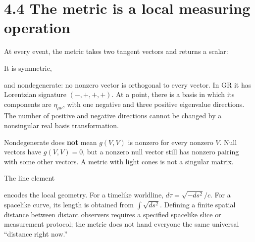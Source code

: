 \documentclass[
  11pt,
  letterpaper,
  oneside,
  openany]{scrbook}
\begin{document}
\hypertarget{the-metric-is-a-local-measuring-operation}{%
\section{4.4 The metric is a local measuring
operation}\label{the-metric-is-a-local-measuring-operation}}

At every event, the metric takes two tangent vectors and returns a
scalar:

\begin{center}
\begingroup
{}
\ifdim\wd\grmathbox>\linewidth
\resizebox{\linewidth}{!}{\usebox{\grmathbox}}
\else\usebox{\grmathbox}\fi
\endgroup
\end{center}

It is symmetric,

\begin{center}
\begingroup
{}
\ifdim\wd\grmathbox>\linewidth
\resizebox{\linewidth}{!}{\usebox{\grmathbox}}
\else\usebox{\grmathbox}\fi
\endgroup
\end{center}

and nondegenerate: no nonzero vector is orthogonal to every vector. In
GR it has Lorentzian signature \((-,+,+,+)\). At a point, there is a
basis in which its components are \(\eta_{\mu\nu}\), with one negative
and three positive eigenvalue directions. The number of positive and
negative directions cannot be changed by a nonsingular real basis
transformation.

Nondegenerate does \textbf{not} mean \(g(V,V)\) is nonzero for every
nonzero \(V\). Null vectors have \(g(V,V)=0\), but a nonzero null vector
still has nonzero pairing with some other vectors. A metric with light
cones is not a singular matrix.

The line element

\begin{center}
\begingroup
{}
\ifdim\wd\grmathbox>\linewidth
\resizebox{\linewidth}{!}{\usebox{\grmathbox}}
\else\usebox{\grmathbox}\fi
\endgroup
\end{center}

encodes the local geometry. For a timelike worldline,
\(d\tau=\sqrt{-ds^2}/c\). For a spacelike curve, its length is obtained
from \(\int\sqrt{ds^2}\). Defining a finite spatial distance between
distant observers requires a specified spacelike slice or measurement
protocol; the metric does not hand everyone the same universal
``distance right now.''
\end{document}
